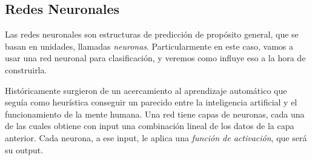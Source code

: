\subsection{Redes Neuronales}
Las redes neuronales son estructuras de predicción de propósito general, que se basan en unidades, llamadas \emph{neuronas}. Particularmente en este caso, vamos a usar una red neuronal para clasificación, y veremos como influye eso a la hora de construirla.

Históricamente %
surgieron de un acercamiento al aprendizaje automático que seguía como heurística conseguir un parecido entre la inteligencia artificial y el funcionamiento de la mente humana. Una red tiene capas de neuronas, cada una de las cuales obtiene con input una combinación lineal de los datos de la capa anterior. Cada neurona, a ese input, le aplica una \emph{función de activación}, que será su output.

